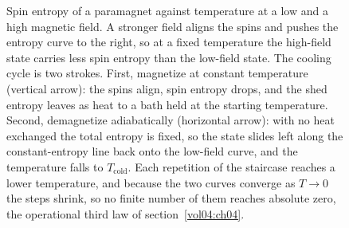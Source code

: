 \begin{figure}[htbp]
\caption[Adiabatic demagnetization on the spin entropy--temperature plane]{Spin
entropy of a paramagnet against temperature at a low and a high magnetic field.
A stronger field aligns the spins and pushes the entropy curve to the right, so
at a fixed temperature the high-field state carries less spin entropy than the
low-field state. The cooling cycle is two strokes. First, magnetize at constant
temperature (vertical arrow): the spins align, spin entropy drops, and the shed
entropy leaves as heat to a bath held at the starting temperature. Second,
demagnetize adiabatically (horizontal arrow): with no heat exchanged the total
entropy is fixed, so the state slides left along the constant-entropy line back
onto the low-field curve, and the temperature falls to $T_{\mathrm{cold}}$. Each
repetition of the staircase reaches a lower temperature, and because the two
curves converge as $T \to 0$ the steps shrink, so no finite number of them
reaches absolute zero, the operational third law of
section~\ref{vol04:ch04}.}
\label{fig:vol04ch04:adiabatic-demag}
\end{figure}

